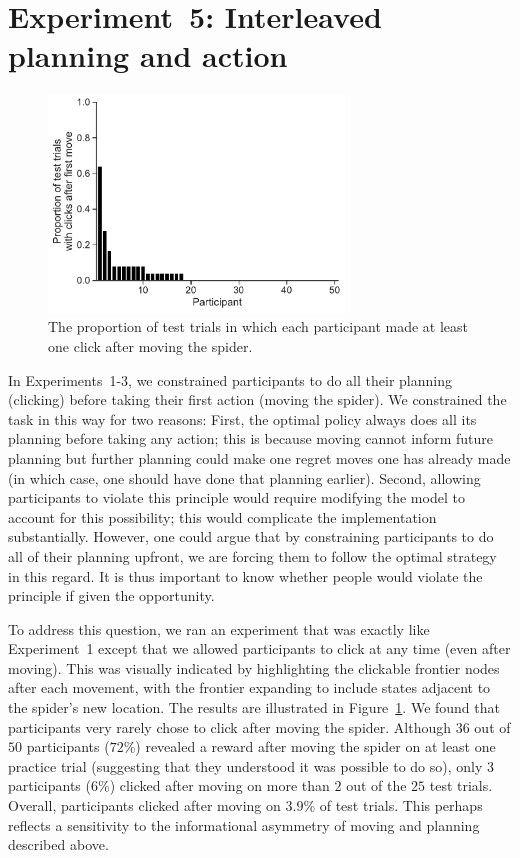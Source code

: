 \section{Experiment~5: Interleaved planning and action}\label{app:planning-experiment5}


\begin{figure}[t!]
    \centering
    \includegraphics[width=0.7\textwidth]{figs/planning/interleaved.pdf}
    \caption{ The proportion of test trials in which each participant made at least one click after moving the spider.}
    \label{fig:exp5}
\end{figure}


In Experiments~1-3, we constrained participants to do all their planning (clicking) before taking their first action (moving the spider). We constrained the task in this way for two reasons: First, the optimal policy always does all its planning before taking any action; this is because moving cannot inform future planning but further planning could make one regret moves one has already made (in which case, one should have done that planning earlier). Second, allowing participants to violate this principle would require modifying the model to account for this possibility; this would complicate the implementation substantially. However, one could argue that by constraining participants to do all of their planning upfront, we are forcing them to follow the optimal strategy in this regard. It is thus important to know whether people would violate the principle if given the opportunity.

To address this question, we ran an experiment that was exactly like Experiment~1 except that we allowed participants to click at any time (even after moving). This was visually indicated by highlighting the clickable frontier nodes after each movement, with the frontier expanding to include states adjacent to the spider's new location. The results are illustrated in Figure~\ref{fig:exp5}. We found that participants very rarely chose to click after moving the spider. Although $36$ out of $50$ participants ($72$\%) revealed a reward after moving the spider on at least one practice trial (suggesting that they understood it was possible to do so), only $3$ participants ($6$\%) clicked after moving on more than $2$ out of the $25$ test trials. Overall, participants clicked after moving on $3.9$\% of test trials. This perhaps reflects a sensitivity to the informational asymmetry of moving and planning described above.


